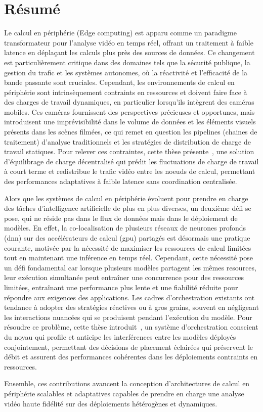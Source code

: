 \chapter*{Résumé}

Le calcul en périphérie (Edge computing) est apparu comme un paradigme transformateur pour l'analyse vidéo en temps réel, offrant un traitement à faible latence en déplaçant les calculs plus près des sources de données. Ce changement est particulièrement critique dans des domaines tels que la sécurité publique, la gestion du trafic et les systèmes autonomes, où la réactivité et l'efficacité de la bande passante sont cruciales. Cependant, les environnements de calcul en périphérie sont intrinsèquement contraints en ressources et doivent faire face à des charges de travail dynamiques, en particulier lorsqu'ils intègrent des caméras mobiles. Ces caméras fournissent des perspectives précieuses et opportunes, mais  introduisent une imprévisibilité dans le volume de données et les éléments visuels présents dans les scènes filmées, ce qui remet en question les pipelines (chaines de traitement) d'analyse traditionnels et les stratégies de distribution de charge de travail statiques. Pour relever ces contraintes, cette thèse présente~\videojam{}, une solution d'équilibrage de charge décentralisé qui prédit les fluctuations de charge de travail à court terme et redistribue le trafic vidéo entre les noeuds de calcul, permettant des performances adaptatives à faible latence sans coordination centralisée.

Alors que les systèmes de calcul en périphérie évoluent pour prendre en charge des tâches d'intelligence artificielle de plus en plus diverses, un deuxième défi se pose, qui ne réside pas dans le flux de données mais dans le déploiement de modèles. En effet, la co-localisation de plusieurs réseaux de neurones profonds (\acrshort{dnn}) sur des accélérateurs de calcul (\acrshort{gpu}) partagés est désormais une pratique courante, motivée par la nécessité de maximiser les ressources de calcul limitées tout en maintenant une inférence en temps réel. Cependant, cette nécessité pose un défi fondamental car lorsque plusieurs modèles partagent les mêmes resources, leur exécution simultanée peut entraîner une concurrence pour des ressources limitées, entraînant une performance plus lente et une fiabilité réduite pour répondre aux exigences des applications. Les cadres d'orchestration existants ont tendance à adopter des stratégies réactives ou à gros grains, souvent en négligeant les interactions nuancées qui se produisent pendant l'exécution du modèle. Pour résoudre ce problème, cette thèse introduit~\roomie{}, un système d'orchestration conscient du noyau qui profile et anticipe les interférences entre les modèles déployés conjointement, permettant des décisions de placement éclairées qui préservent le débit et assurent des performances cohérentes dans les déploiements contraints en ressources.

Ensemble, ces contributions avancent la conception d'architectures de calcul en périphérie scalables et adaptatives capables de prendre en charge une analyse vidéo haute fidélité sur des déploiements hétérogènes et dynamiques.
